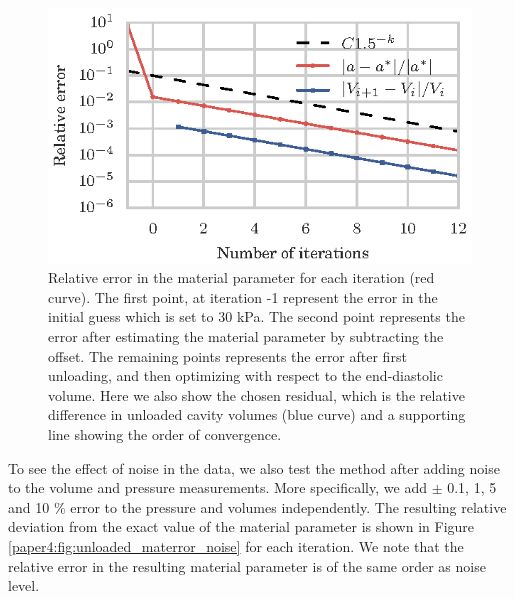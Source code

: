 \begin{figure}[htbp]
  \centering
  \includegraphics{figures/materror}
  \caption{\label{paper4:fig:unloaded_materror}Relative error in the material parameter for each iteration
  (red curve). The first point, at iteration -1 represent the error in
  the initial guess which is set to 30 kPa. The second point
  represents the error after estimating the material parameter by
  subtracting the offset. The remaining points represents the error
  after first unloading, and then optimizing with respect to the
  end-diastolic volume. Here we also show the chosen residual, which
  is the relative difference in unloaded cavity volumes (blue curve) and a
  supporting line showing the order of convergence. }
\end{figure}

To see the effect of noise in the data, we also test the method after
adding noise to the volume and pressure measurements. More specifically, we add
$\pm$ 0.1, 1, 5 and 10 $\%$ error to the pressure and volumes
independently. The resulting relative deviation from the exact value of the
material parameter is shown in Figure
\ref{paper4:fig:unloaded_materror_noise} for each iteration. We note that the
relative error in the resulting material parameter is of the same
order as noise level.

